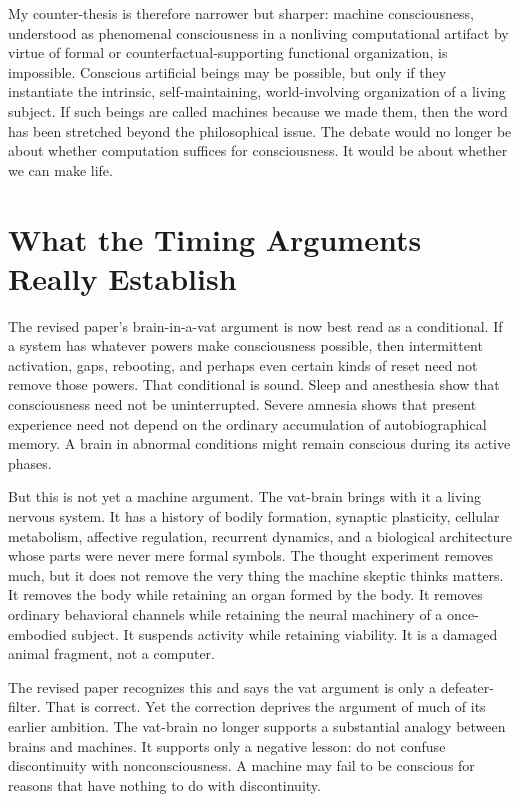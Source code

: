 \documentclass[11pt]{article}
\begin{document}
My counter-thesis is therefore narrower but sharper: machine consciousness, understood as phenomenal consciousness in a nonliving computational artifact by virtue of formal or counterfactual-supporting functional organization, is impossible. Conscious artificial beings may be possible, but only if they instantiate the intrinsic, self-maintaining, world-involving organization of a living subject. If such beings are called machines because we made them, then the word has been stretched beyond the philosophical issue. The debate would no longer be about whether computation suffices for consciousness. It would be about whether we can make life.

\section{What the Timing Arguments Really Establish}

The revised paper's brain-in-a-vat argument is now best read as a conditional. If a system has whatever powers make consciousness possible, then intermittent activation, gaps, rebooting, and perhaps even certain kinds of reset need not remove those powers. That conditional is sound. Sleep and anesthesia show that consciousness need not be uninterrupted. Severe amnesia shows that present experience need not depend on the ordinary accumulation of autobiographical memory. A brain in abnormal conditions might remain conscious during its active phases.

But this is not yet a machine argument. The vat-brain brings with it a living nervous system. It has a history of bodily formation, synaptic plasticity, cellular metabolism, affective regulation, recurrent dynamics, and a biological architecture whose parts were never mere formal symbols. The thought experiment removes much, but it does not remove the very thing the machine skeptic thinks matters. It removes the body while retaining an organ formed by the body. It removes ordinary behavioral channels while retaining the neural machinery of a once-embodied subject. It suspends activity while retaining viability. It is a damaged animal fragment, not a computer.

The revised paper recognizes this and says the vat argument is only a defeater-filter. That is correct. Yet the correction deprives the argument of much of its earlier ambition. The vat-brain no longer supports a substantial analogy between brains and machines. It supports only a negative lesson: do not confuse discontinuity with nonconsciousness. A machine may fail to be conscious for reasons that have nothing to do with discontinuity.
\end{document}
